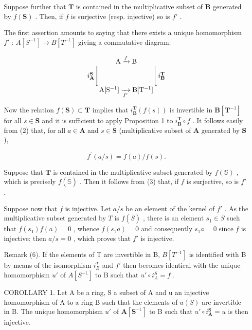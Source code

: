 Suppose further that \(\mathbf{T}\) is contained in the multiplicative subset of \(\mathbf{B}\) generated by \(f(\mathbf{S})\) . Then, if \(f\) is surjective (resp. injective) so is \(f'\) .

The first assertion amounts to saying that there exists a unique homomorphism \(f'\) : \(A[S^{-1}] \to B[T^{-1}]\) giving a commutative diagram:

\[
\begin{array}{c} \mathrm{A} \xrightarrow {f} \mathrm{B} \\ i _ {\mathbf {A}} ^ {\mathbf {S}} \Biggl \downarrow \qquad \qquad \qquad \qquad \Biggl \downarrow i _ {\mathbf {B}} ^ {\mathbf {T}} \\ \mathrm{A} [ \mathrm{S} ^ {- 1} ] \xrightarrow [ f ^ {\prime} ]{} \mathrm{B} [ \mathrm{T} ^ {- 1} ] \end{array}
\]

Now the relation \(f(\mathbf{S}) \subset \mathbf{T}\) implies that \(i_{\mathbf{B}}^{\mathbf{T}}(f(s))\) is invertible in \(\mathbf{B}[\mathbf{T}^{-1}]\) for all \(s \in \mathbf{S}\) and it is sufficient to apply Proposition 1 to \(i_{\mathbf{B}}^{\mathbf{T}} \circ f\) . It follows easily from (2) that, for all \(a \in \mathbf{A}\) and \(s \in \overline{\mathbf{S}}\) (multiplicative subset of \(\mathbf{A}\) generated by \(\mathbf{S}\) ),

\[
f ^ {\prime} (a / s) = f (a) / f (s).\tag{3}
\]

Suppose that \(\mathbf{T}\) is contained in the multiplicative subset generated by \(f(\mathbb{S})\) , which is precisely \(f(\overline{\mathbb{S}})\) . Then it follows from (3) that, if \(f\) is surjective, so is \(f'\) .

Suppose now that \(f\) is injective. Let \(a / s\) be an element of the kernel of \(f'\) . As the multiplicative subset generated by \(T\) is \(f(\overline{S})\) , there is an element \(s_1 \in \overline{S}\) such that \(f(s_1)f(a) = 0\) , whence \(f(s_1a) = 0\) and consequently \(s_1a = 0\) since \(f\) is injective; then \(a / s = 0\) , which proves that \(f'\) is injective.

Remark (6). If the elements of T are invertible in B, \(B[T^{-1}]\) is identified with B by means of the isomorphism \(i_{B}^{T}\) and \(f'\) then becomes identical with the unique homomorphism \(u'\) of \(A[S^{-1}]\) to B such that \(u' \circ i_{A}^{S} = f\) .

COROLLARY 1. Let A be a ring, S a subset of A and u an injective homomorphism of A to a ring B such that the elements of \(u(S)\) are invertible in B. The unique homomorphism \(u'\) of \(\mathbf{A}[\mathbf{S}^{-1}]\) to B such that \(u' \circ i_{\mathbf{A}}^{\mathbf{S}} = u\) is then injective.

